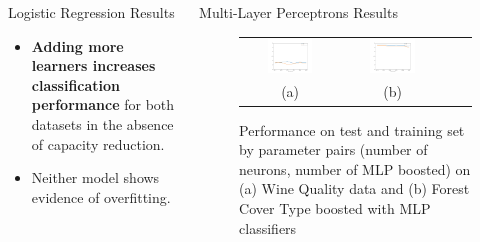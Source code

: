 \documentclass[final]{beamer}
\newlength{\onecolwid}
\newlength{\twocolwid}
\begin{document}
\begin{frame}[t]
\begin{columns}[t]
\begin{column}{\twocolwid}
\begin{columns}[t,totalwidth=\twocolwid]
\begin{column}{\onecolwid}
\begin{block}{Logistic Regression Results}
\begin{itemize}
    \item \textbf{Adding more learners increases classification performance} for both datasets in the absence of capacity reduction.
    \item Neither model shows evidence of overfitting.
\end{itemize}

\end{block}
\end{column} %

\begin{column}{\onecolwid} %


\begin{block}{Multi-Layer Perceptrons Results}

\begin{figure} [H]
    \centering
    \begin{tabular}{cccc}
    \includegraphics[width=0.5\textwidth]{mlp-wine-boosted_f1.png}
    & \includegraphics[width=0.5\textwidth]{mlp-covtype_balanced-boosted_f1.png} \\
    (a) & (b)\\[6pt]
    \end{tabular}
    \caption{Performance on test and training set by parameter pairs (number of neurons, number of MLP boosted) on (a) Wine Quality data and (b) Forest Cover Type boosted with MLP classifiers}
    \label{fig:MLP_results}
\end{figure}


\end{block}
\end{column}
\end{columns}
\end{column}
\end{columns}
\end{frame}
\end{document}
